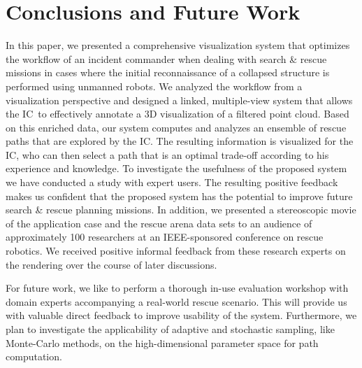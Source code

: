 \documentclass[review,journal]{vgtc}         %
\def\IC{IC}
\begin{document}
\section{Conclusions and Future Work} \label{sec:conclusion}
In this paper, we presented a comprehensive visualization system that optimizes the workflow of an incident commander when dealing with search \& rescue missions in cases where the initial reconnaissance of a collapsed structure is performed using unmanned robots. We analyzed the workflow from a visualization perspective and designed a linked, multiple-view system that allows the \IC\ to effectively annotate a 3D visualization of a filtered point cloud. Based on this enriched data, our system computes and analyzes an ensemble of rescue paths that are explored by the \IC . The resulting information is visualized for the \IC , who can then select a path that is an optimal trade-off according to his experience and knowledge. To investigate the usefulness of the proposed system we have conducted a study with expert users. The resulting positive feedback makes us confident that the proposed system has the potential to improve future search \& rescue planning missions. In addition, we presented a stereoscopic movie of the application case and the rescue arena data sets to an audience of approximately 100 researchers at an IEEE-sponsored conference on rescue robotics. We received positive informal feedback from these research experts on the rendering over the course of later discussions.

For future work, we like to perform a thorough in-use evaluation workshop with domain experts accompanying a real-world rescue scenario. This will provide us with valuable direct feedback to improve usability of the system. Furthermore, we plan to investigate the applicability of adaptive and stochastic sampling, like Monte-Carlo methods, on the high-dimensional parameter space for path computation.





\end{document}
